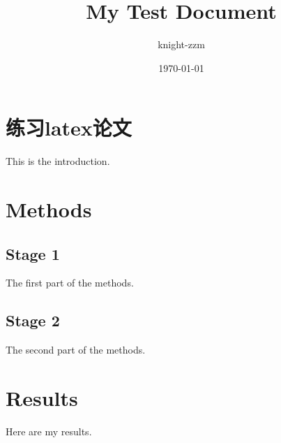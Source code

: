 \documentclass[a4paper,12pt]{report}
\begin{document}
\title{My Test Document}
\author{knight-zzm}
\date{\today}
\maketitle

\section{练习latex论文}
This is the introduction.

\section{Methods}

\subsection{Stage 1}
The first part of the methods.

\subsection{Stage 2}
The second part of the methods.

\section{Results}
Here are my results.
\end{document}
